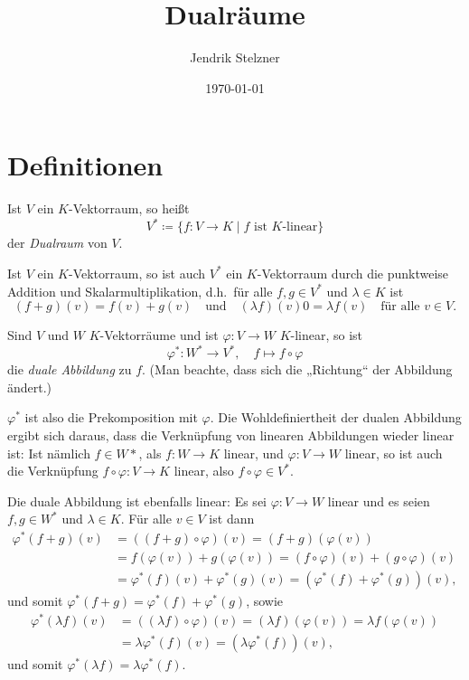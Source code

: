 \documentclass[a4paper,10pt]{article}
\title{Dualräume}
\author{Jendrik Stelzner}
\date{\today}
\begin{document}
\maketitle

\tableofcontents










\section{Definitionen}

\begin{defi}
 Ist $V$ ein $K$-Vektorraum, so heißt
 \[
  V^* \coloneqq \{f \colon V \to K \mid \text{$f$ ist $K$-linear}\}
 \]
 der \emph{Dualraum} von $V$.
\end{defi}

Ist $V$ ein $K$-Vektorraum, so ist auch $V^*$ ein $K$-Vektorraum durch die punktweise Addition und Skalarmultiplikation, d.h.\ für alle $f,g \in V^*$ und $\lambda \in K$ ist
\[
 (f+g)(v) = f(v) + g(v)
 \quad\text{und}\quad
 (\lambda f)(v)0= \lambda f(v)
 \quad \text{für alle $v \in V$}.
\]

\begin{defi}
 Sind $V$ und $W$ $K$-Vektorräume und ist $\varphi \colon V \to W$ $K$-linear, so ist
 \[
  \varphi^* \colon W^* \to V^*, \quad f \mapsto f \circ \varphi
 \]
 die \emph{duale Abbildung} zu $f$. (Man beachte, dass sich die „Richtung“ der Abbildung ändert.)
\end{defi}

$\varphi^*$ ist also die Prekomposition mit $\varphi$. Die Wohldefiniertheit der dualen Abbildung ergibt sich daraus, dass die Verknüpfung von linearen Abbildungen wieder linear ist: Ist nämlich $f \in W*$, als $f \colon W \to K$ linear, und $\varphi \colon V \to W$ linear, so ist auch die Verknüpfung $f \circ \varphi \colon V \to K$ linear, also $f \circ \varphi \in V^*$.

Die duale Abbildung ist ebenfalls linear: Es sei $\varphi \colon V \to W$ linear und es seien $f,g \in W^*$ und $\lambda \in K$. Für alle $v \in V$ ist dann
\begin{align*}
 \varphi^*(f+g)(v)
 &= ((f+g) \circ \varphi)(v)
 = (f+g)(\varphi(v)) \\
 &= f(\varphi(v)) + g(\varphi(v))
 = (f \circ \varphi)(v) + (g \circ \varphi)(v) \\
 &= \varphi^*(f)(v) + \varphi^*(g)(v)
 = (\varphi^*(f)+\varphi^*(g))(v),
\end{align*}
und somit $\varphi^*(f+g) = \varphi^*(f) + \varphi^*(g)$, sowie
\begin{align*}
 \varphi^*(\lambda f)(v)
 &= ((\lambda f) \circ \varphi)(v)
 = (\lambda f)(\varphi(v))
 = \lambda f(\varphi(v)) \\
 &= \lambda \varphi^*(f)(v)
 = (\lambda \varphi^*(f))(v),
\end{align*}
und somit $\varphi^*(\lambda f) =  \lambda \varphi^*(f)$.
\end{document}
